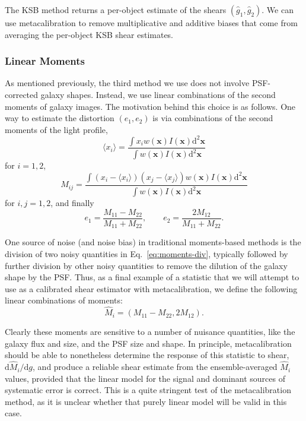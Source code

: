 \documentclass[iop]{emulateapj}
\begin{document}
The KSB method returns a per-object estimate of the shears
$(\hat{g}_1, \hat{g}_2)$. We can use metacalibration to
remove multiplicative and additive biases that come from averaging the
per-object KSB shear estimates.

\subsubsection{Linear Moments}

As mentioned previously, the third method we use does not involve
PSF-corrected galaxy shapes.  Instead, we use linear combinations of
the second moments of galaxy images.  The motivation behind this
choice is as follows.  One way to estimate the distortion $(e_1,e_2)$
is via combinations of the second moments of the light profile,
\begin{equation}
\langle x_i\rangle = \frac{\int x_i w({\mathbf x}) I({\mathbf x}) \mathrm{d}^2{\mathbf x}}{\int w({\mathbf x}) I({\mathbf x}) \mathrm{d}^2{\mathbf x}}
\end{equation}
for $i=1, 2$,
\begin{equation}
M_{ij} = \frac{\int (x_i-\langle x_i\rangle)(x_j-\langle x_j\rangle) w({\mathbf x}) I({\mathbf x}) \mathrm{d}^2{\mathbf x}}{\int w({\mathbf x}) I({\mathbf x}) \mathrm{d}^2{\mathbf x}}
\end{equation}
for $i,j=1,2$, and finally 
\begin{equation}\label{eq:moments-div}
e_1 = \frac{M_{11}-M_{22}}{M_{11}+M_{22}}, \qquad e_2 =\frac{2M_{12}}{M_{11}+M_{22}}.
\end{equation}

One source of noise (and noise bias) in traditional moments-based methods is the
division of two noisy quantities in Eq.~\ref{eq:moments-div},
typically followed by further division by other noisy quantities to
remove the dilution of the galaxy shape by the PSF.  Thus, as a final
example of a statistic that we will attempt to use as a calibrated
shear estimator with metacalibration, we define the following linear
combinations of moments:
\begin{equation}
\hat{M}_i = (M_{11}-M_{22}, 2M_{12}).
\end{equation}

Clearly these moments are sensitive to a number of nuisance
quantities, like the galaxy flux and size, and the PSF size and shape.
In principle, metacalibration should be able to nonetheless determine
the response of this statistic to shear,
$\mathrm{d}\hat{M}_i/\mathrm{d}g$, and produce a reliable shear
estimate from the ensemble-averaged $\hat{M}_i$ values, provided that
the linear model for the signal and dominant sources of systematic
error is correct.  This is a quite stringent test of the
metacalibration method, as it is unclear whether that purely linear
model will be valid in this case.
\end{document}

